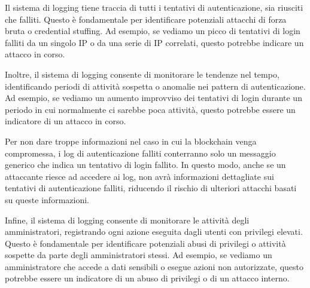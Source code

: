 Il sistema di logging tiene traccia di tutti i tentativi di autenticazione, sia riusciti che falliti. Questo è fondamentale per identificare potenziali attacchi di forza bruta o credential stuffing. Ad esempio, se vediamo un picco di tentativi di login falliti da un singolo IP o da una serie di IP correlati, questo potrebbe indicare un attacco in corso.

Inoltre, il sistema di logging consente di monitorare le tendenze nel tempo, identificando periodi di attività sospetta o anomalie nei pattern di autenticazione. Ad esempio, se vediamo un aumento improvviso dei tentativi di login durante un periodo in cui normalmente ci sarebbe poca attività, questo potrebbe essere un indicatore di un attacco in corso.

Per non dare troppe informazioni nel caso in cui la blockchain venga compromessa, i log di autenticazione falliti conterranno solo un messaggio generico che indica un tentativo di login fallito. In questo modo, anche se un attaccante riesce ad accedere ai log, non avrà informazioni dettagliate sui tentativi di autenticazione falliti, riducendo il rischio di ulteriori attacchi basati su queste informazioni.

Infine, il sistema di logging consente di monitorare le attività degli amministratori, registrando ogni azione eseguita dagli utenti con privilegi elevati. Questo è fondamentale per identificare potenziali abusi di privilegi o attività sospette da parte degli amministratori stessi. Ad esempio, se vediamo un amministratore che accede a dati sensibili o esegue azioni non autorizzate, questo potrebbe essere un indicatore di un abuso di privilegi o di un attacco interno.



